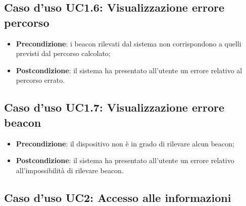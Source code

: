 \documentclass[../AnalisiDeiRequisiti.tex]{subfiles}
\begin{document}
\subsection{Caso d'uso UC1.6: Visualizzazione errore percorso}
\begin{itemize}
    \item \textbf{Precondizione}: i beacon rilevati dal sistema non corrispondono a quelli previsti dal percorso calcolato;
    \item \textbf{Postcondizione}: il sistema ha presentato all'utente un errore relativo al percorso errato.
  \end{itemize}
\hypertarget{UC1.7}{}
\subsection{Caso d'uso UC1.7: Visualizzazione errore beacon}
\begin{itemize}
    \item \textbf{Precondizione}: il dispositivo non è in grado di rilevare alcun beacon;
    \item \textbf{Postcondizione}: il sistema ha presentato all'utente un errore relativo all'impossibilità di rilevare beacon.
  \end{itemize}
\hypertarget{UC2}{}
\subsection{Caso d'uso UC2: Accesso alle informazioni}
\end{document}
